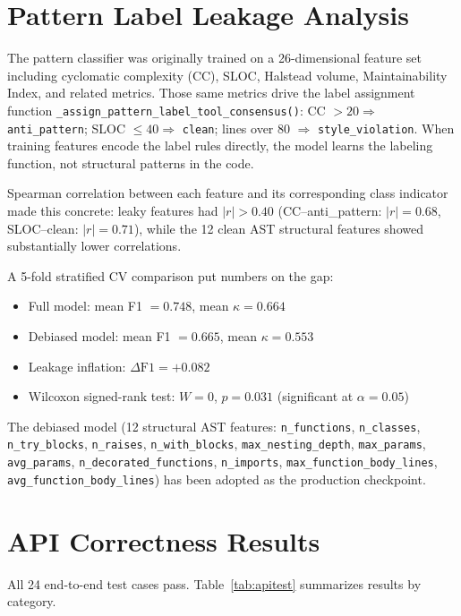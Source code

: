 \documentclass[12pt, oneside]{report}
\begin{document}
\section{Pattern Label Leakage Analysis}
\label{ssec:pattern-leakage}

The pattern classifier was originally trained on a 26-dimensional feature set including
cyclomatic complexity (CC), SLOC, Halstead volume, Maintainability Index, and related
metrics. Those same metrics drive the label assignment function
\texttt{\_assign\_pattern\_label\_tool\_consensus()}: CC $> 20 \Rightarrow$
\texttt{anti\_pattern}; SLOC $\leq 40 \Rightarrow$ \texttt{clean};
lines over 80 $\Rightarrow$ \texttt{style\_violation}. When training features encode the
label rules directly, the model learns the labeling function, not structural patterns in
the code.

Spearman correlation between each feature and its corresponding class indicator made this
concrete: leaky features had $|r| > 0.40$ (CC--anti\_pattern: $|r|=0.68$,
SLOC--clean: $|r|=0.71$), while the 12 clean AST structural features showed substantially
lower correlations.

A 5-fold stratified CV comparison put numbers on the gap:
\begin{itemize}
  \item Full model: mean F1 $= 0.748$, mean $\kappa = 0.664$
  \item Debiased model: mean F1 $= 0.665$, mean $\kappa = 0.553$
  \item Leakage inflation: $\Delta\text{F1} = +0.082$
  \item Wilcoxon signed-rank test: $W = 0$, $p = 0.031$ (significant at $\alpha = 0.05$)
\end{itemize}

The debiased model (12 structural AST features: \texttt{n\_functions},
\texttt{n\_classes}, \texttt{n\_try\_blocks}, \texttt{n\_raises},
\texttt{n\_with\_blocks}, \texttt{max\_nesting\_depth}, \texttt{max\_params},
\texttt{avg\_params}, \texttt{n\_decorated\_functions}, \texttt{n\_imports},
\texttt{max\_function\_body\_lines}, \texttt{avg\_function\_body\_lines}) has been
adopted as the production checkpoint.

\section{API Correctness Results}
\label{sec:api-results}

All 24 end-to-end test cases pass. Table~\ref{tab:apitest} summarizes results by category.
\end{document}

